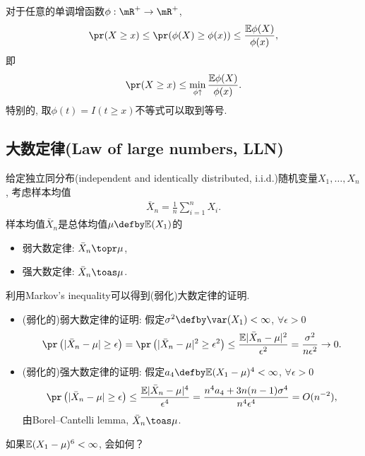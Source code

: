 \begin{remark}
对于任意的单调增函数$\phi: \mR^{+} \to \mR^{+}$, 
\begin{align*}
	\pr(X \geq x) \leq \pr(\phi(X) \geq \phi(x)) \leq \frac{\E \phi(X)}{\phi(x)},
\end{align*}
即
\begin{align*}
	\pr(X \geq x) \leq \min_{\phi \uparrow} 	\frac{\E \phi(X)}{\phi(x)}.
\end{align*}	
特别的, 取$\phi(t)=I(t \geq x)$不等式可以取到等号.
\end{remark}




\subsection{大数定律(Law of large numbers, LLN)}
	给定独立同分布(independent and identically distributed, i.i.d.)随机变量$X_1,\ldots,X_n$, 考虑样本均值
\begin{align*}
	\bar{X}_n=\frac{1}{n} \sum_{i=1}^n X_i.
\end{align*}
样本均值$\bar{X}_n$是总体均值$\mu \defby \E (X_1)$的
\begin{itemize}
	\item 弱大数定律: $\bar{X}_n \topr \mu$,
	\item 强大数定律: $\bar{X}_n \toas \mu$.
\end{itemize}
利用Markov's inequality可以得到(弱化)大数定律的证明.
\begin{itemize}
	\item (弱化的)弱大数定律的证明: 假定$\sigma^2  \defby \var(X_1)<\infty$, $\forall \epsilon>0$
	\begin{align*}
		\pr\left(|\bar{X}_n-\mu| \geq \epsilon \right)=\pr\left(|\bar{X}_n-\mu|^2 \geq \epsilon^2 \right)\leq \frac{\E |\bar{X}_n-\mu|^2}{\epsilon^2}=\frac{\sigma^2}{n \epsilon^2} \to 0.
	\end{align*}
	\item (弱化的)强大数定律的证明: 假定$a_4\defby \E(X_1-\mu)^4<\infty$, $\forall \epsilon>0$
	\begin{align*}
		\pr\left(|\bar{X}_n-\mu| \geq \epsilon \right) \leq \frac{\E |\bar{X}_n-\mu|^4}{\epsilon^4}=\frac{n^4 a_4+3n(n-1)\sigma^4}{n^4 \epsilon^4}=O(n^{-2}),
	\end{align*}
	由Borel–Cantelli lemma, $\bar{X}_n \toas \mu$. 
\end{itemize}	
\begin{ques}
	如果$\mathbb{E}(X_1-\mu)^6<\infty$, 会如何？
\end{ques}


